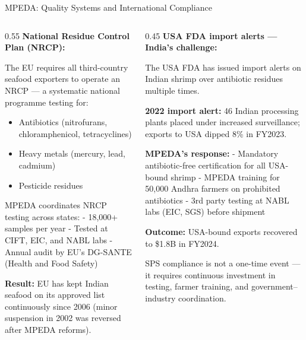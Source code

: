\documentclass[
  ignorenonframetext,
  aspectratio=169,
]{beamer}
\makeatletter
\providecommand{\tightlist}{%
  \setlength{\itemsep}{0pt}\setlength{\parskip}{0pt}}
\let\quarto@originallabel\label
\DeclareRobustCommand*{\label}[1]{\quarto@originallabel{#1}}
\makeatother
\begin{document}
\begin{frame}{MPEDA: Quality Systems and International Compliance}
\label{mpeda-quality-systems-and-international-compliance}
\begin{columns}[T]
\begin{column}{0.55\linewidth}
\textbf{National Residue Control Plan (NRCP):}

The EU requires all third-country seafood exporters to operate an NRCP
--- a systematic national programme testing for:

\begin{itemize}
\tightlist
\item
  Antibiotics (nitrofurans, chloramphenicol, tetracyclines)
\item
  Heavy metals (mercury, lead, cadmium)
\item
  Pesticide residues
\end{itemize}

MPEDA coordinates NRCP testing across states: - 18,000+ samples per year
- Tested at CIFT, EIC, and NABL labs - Annual audit by EU's DG-SANTE
(Health and Food Safety)

\textbf{Result:} EU has kept Indian seafood on its approved list
continuously since 2006 (minor suspension in 2002 was reversed after
MPEDA reforms).
\end{column}

\begin{column}{0.45\linewidth}
\textbf{USA FDA import alerts --- India's challenge:}

The USA FDA has issued import alerts on Indian shrimp over antibiotic
residues multiple times.

\textbf{2022 import alert:} 46 Indian processing plants placed under
increased surveillance; exports to USA dipped 8\% in FY2023.

\textbf{MPEDA's response:} - Mandatory antibiotic-free certification for
all USA-bound shrimp - MPEDA training for 50,000 Andhra farmers on
prohibited antibiotics - 3rd party testing at NABL labs (EIC, SGS)
before shipment

\textbf{Outcome:} USA-bound exports recovered to \$1.8B in FY2024.

SPS compliance is not a one-time event --- it requires continuous
investment in testing, farmer training, and government--industry
coordination.
\end{column}
\end{columns}
\end{frame}
\end{document}
